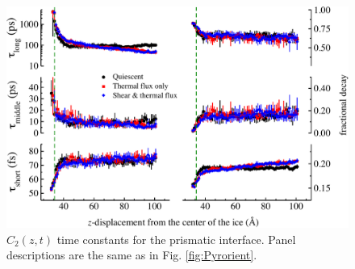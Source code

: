 \begin{figure}
\includegraphics[width=\linewidth]{Figures/Pri_lcorrz}
\caption{\label{fig:Porient} $C_2(z,t)$ time constants for the prismatic
  interface.  Panel descriptions are the same as in
  Fig. \ref{fig:Pyrorient}.}
\end{figure}

\newpage

